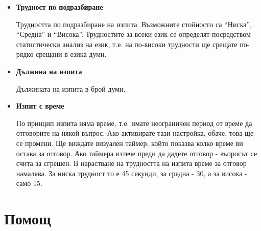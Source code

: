 \begin{itemize}
  \item \textbf{Трудност по подразбиране}

    Трудността по подразбиране на изпита. Възможните стойности са
    "`Ниска"', "`Средна"' и "`Висока"'. Трудностите за всеки език се
    определят посредством статистически анализ на език, т.е. на
    по-високи трудности ще срещате по-рядко срещани в езика думи.

  \item \textbf{Дължина на изпита}

    Дължината на изпита в брой думи.

  \item \textbf{Изпит с време}

    По принцип изпита няма време, т.е. имате неограничен период от
    време да отговорите на някой въпрос. Ако активирате тази
    настройка, обаче, това ще се промени. Ще виждате визуален таймер,
    който показва колко време ви остава за отговор. Ако таймера изтече
    преди да дадете отговор - въпросът се счита за сгрешен. В
    нарастване на трудността на изпита време за отговор намалява. За
    ниска трудност то е 45 секунди, за средна - 30, а за висока - само
    15.
\end{itemize}
\section{Помощ}
